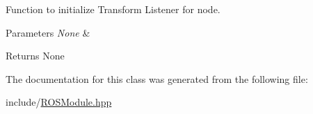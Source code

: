 Function to initialize Transform Listener for node. 


\begin{DoxyParams}{Parameters}
{\em None} & \\
\hline
\end{DoxyParams}
\begin{DoxyReturn}{Returns}
None 
\end{DoxyReturn}


The documentation for this class was generated from the following file\+:\begin{DoxyCompactItemize}
\item 
include/\hyperlink{ROSModule_8hpp}{R\+O\+S\+Module.\+hpp}\end{DoxyCompactItemize}
